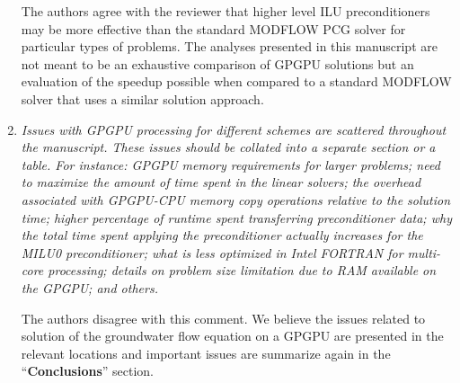 \documentclass[12pt]{article} %
\begin{document}
\begin{enumerate}
The authors agree with the reviewer that higher level ILU preconditioners may be more effective than the standard MODFLOW PCG solver for particular types of problems. The analyses presented in this manuscript are not meant to be an exhaustive comparison of GPGPU solutions but an evaluation of the speedup possible when compared to a standard MODFLOW solver that uses a similar solution approach.  

\item \textit{Issues with GPGPU processing for different schemes are scattered throughout the manuscript. These issues should be collated into a separate section or a table. For instance: GPGPU memory requirements for larger problems; need to maximize the amount of time spent in the linear solvers; the overhead associated with GPGPU-CPU memory copy operations relative to the solution time; higher percentage of runtime spent transferring preconditioner data; why the total time spent applying the preconditioner actually increases for the MILU0 preconditioner; what is less optimized in Intel FORTRAN for multi-core processing; details on problem size limitation due to RAM available on the GPGPU; and others.} 

The authors disagree with this comment. We believe the issues related to solution of the groundwater flow equation on a GPGPU are presented in the relevant locations and important issues are summarize again in the ``\textbf{Conclusions}'' section.

\end{enumerate}
\end{document}
